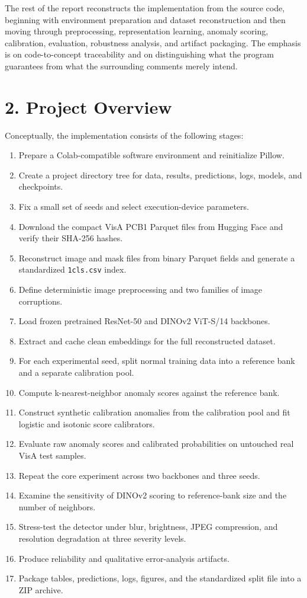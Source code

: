 \documentclass[
  11pt,
]{article}
\providecommand{\tightlist}{%
  \setlength{\itemsep}{0pt}\setlength{\parskip}{0pt}}
\begin{document}
The rest of the report reconstructs the implementation from the source
code, beginning with environment preparation and dataset reconstruction
and then moving through preprocessing, representation learning, anomaly
scoring, calibration, evaluation, robustness analysis, and artifact
packaging. The emphasis is on code-to-concept traceability and on
distinguishing what the program guarantees from what the surrounding
comments merely intend.

\section{2. Project Overview}\label{project-overview}

Conceptually, the implementation consists of the following stages:

\begin{enumerate}
\def\labelenumi{\arabic{enumi}.}
\tightlist
\item
  Prepare a Colab-compatible software environment and reinitialize
  Pillow.
\item
  Create a project directory tree for data, results, predictions, logs,
  models, and checkpoints.
\item
  Fix a small set of seeds and select execution-device parameters.
\item
  Download the compact VisA PCB1 Parquet files from Hugging Face and
  verify their SHA-256 hashes.
\item
  Reconstruct image and mask files from binary Parquet fields and
  generate a standardized \texttt{1cls.csv} index.
\item
  Define deterministic image preprocessing and two families of image
  corruptions.
\item
  Load frozen pretrained ResNet-50 and DINOv2 ViT-S/14 backbones.
\item
  Extract and cache clean embeddings for the full reconstructed dataset.
\item
  For each experimental seed, split normal training data into a
  reference bank and a separate calibration pool.
\item
  Compute k-nearest-neighbor anomaly scores against the reference bank.
\item
  Construct synthetic calibration anomalies from the calibration pool
  and fit logistic and isotonic score calibrators.
\item
  Evaluate raw anomaly scores and calibrated probabilities on untouched
  real VisA test samples.
\item
  Repeat the core experiment across two backbones and three seeds.
\item
  Examine the sensitivity of DINOv2 scoring to reference-bank size and
  the number of neighbors.
\item
  Stress-test the detector under blur, brightness, JPEG compression, and
  resolution degradation at three severity levels.
\item
  Produce reliability and qualitative error-analysis artifacts.
\item
  Package tables, predictions, logs, figures, and the standardized split
  file into a ZIP archive.
\end{enumerate}
\end{document}
